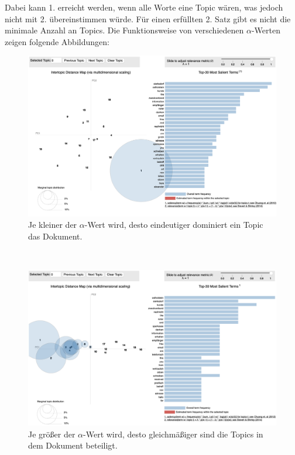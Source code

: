 \documentclass[german,version-2020-11]{uzl-thesis}
\begin{document}
\begin{itemize}
Dabei kann 1. erreicht werden, wenn alle Worte eine Topic wären, was jedoch nicht mit 2. übereinstimmen würde. Für einen erfüllten 2. Satz gibt es nicht die minimale Anzahl an Topics. Die Funktionsweise von verschiedenen $\alpha$-Werten zeigen folgende Abbildungen: 
\\
\begin{figure}[h]
\begin{center}
\includegraphics[scale=0.315]{lda_alpha001.png}
\end{center}
\caption{Je kleiner der $\alpha$-Wert wird, desto eindeutiger dominiert ein Topic das Dokument.} 
\label{fig:img1}
\end{figure}\\
\begin{figure}[h]
\begin{center}
\includegraphics[scale=0.315]{lda_alpha1.png}
\caption{Je größer der $\alpha$-Wert wird, desto gleichmäßiger sind die Topics in dem Dokument beteiligt.}

\end{center}
\end{figure}
\end{itemize}
\end{document}

